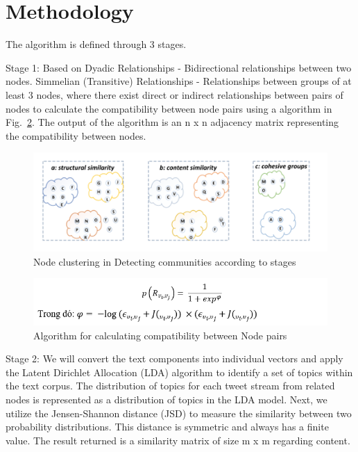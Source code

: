 \documentclass[conference]{IEEEtran}
\begin{document}
\section{Methodology}
The algorithm is defined through 3 stages.

Stage 1: Based on Dyadic Relationships - Bidirectional relationships between two nodes. Simmelian (Transitive) Relationships - Relationships between groups of at least 3 nodes, where there exist direct or indirect relationships between pairs of nodes to calculate the compatibility between node pairs using a algorithm in Fig.~\ref{fig5}.
The output of the algorithm is an n x n adjacency matrix representing the compatibility between nodes.
\begin{figure}[htbp]
    \centerline{\includegraphics[scale=0.5]{fig4.png}}
    \caption{Node clustering in Detecting communities according to stages}
    \label{fig4}
\end{figure}

\begin{figure}[htbp]
    \centerline{\includegraphics[scale=0.5]{fig5.png}}
    \caption{Algorithm for calculating compatibility between Node pairs}
    \label{fig5}
\end{figure}

Stage 2: We will convert the text components into individual vectors and apply the Latent Dirichlet Allocation (LDA) algorithm to identify a set of topics within the text corpus.
The distribution of topics for each tweet stream from related nodes is represented as a distribution of topics in the LDA model.
Next, we utilize the Jensen-Shannon distance (JSD) to measure the similarity between two probability distributions. This distance is symmetric and always has a finite value. The result returned is a similarity matrix of size m x m regarding content.
\end{document}
